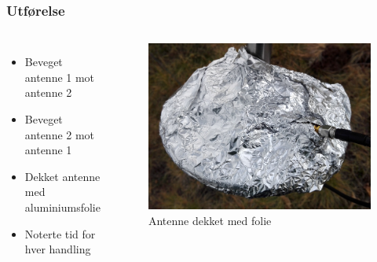 \documentclass[xcolor=table]{beamer}
\begin{document}
\begin{frame}
\frametitle{Utførelse}
  \begin{columns}
      \begin{itemize}
        \item Beveget antenne 1 mot antenne 2
        \item Beveget antenne 2 mot antenne 1
        \item Dekket antenne med aluminiumsfolie
        \item Noterte tid for hver handling
      \end{itemize}
      \begin{figure}
        \includegraphics[scale=0.20]{thesis/graphics/antenna_foil_cover.jpg}
        \caption{Antenne dekket med folie}
      \end{figure}  
    \end{columns}  
\end{frame}
\end{document}
